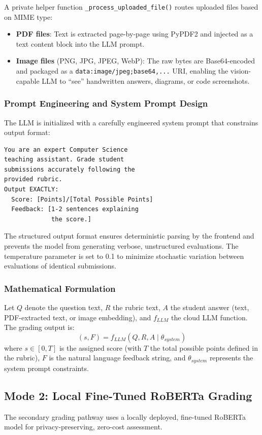\documentclass[conference]{IEEEtran}
\begin{document}
A private helper function \texttt{\_process\_uploaded\_file()} routes uploaded files based on MIME type:
\begin{itemize}[leftmargin=*]
    \item \textbf{PDF files}: Text is extracted page-by-page using PyPDF2 and injected as a text content block into the LLM prompt.
    \item \textbf{Image files} (PNG, JPG, JPEG, WebP): The raw bytes are Base64-encoded and packaged as a \texttt{data:image/jpeg;base64,...} URI, enabling the vision-capable LLM to ``see'' handwritten answers, diagrams, or code screenshots.
\end{itemize}

\subsubsection{Prompt Engineering and System Prompt Design}
The LLM is initialized with a carefully engineered system prompt that constrains output format:
\begin{lstlisting}[caption=AI Grader System Prompt]
You are an expert Computer Science 
teaching assistant. Grade student 
submissions accurately following the 
provided rubric.
Output EXACTLY:
  Score: [Points]/[Total Possible Points]
  Feedback: [1-2 sentences explaining 
             the score.]
\end{lstlisting}

The structured output format ensures deterministic parsing by the frontend and prevents the model from generating verbose, unstructured evaluations. The temperature parameter is set to 0.1 to minimize stochastic variation between evaluations of identical submissions.

\subsubsection{Mathematical Formulation}
Let $Q$ denote the question text, $R$ the rubric text, $A$ the student answer (text, PDF-extracted text, or image embedding), and $f_{LLM}$ the cloud LLM function. The grading output is:
\begin{equation}
(s, F) = f_{LLM}(Q, R, A \mid \theta_{system})
\end{equation}
where $s \in [0, T]$ is the assigned score (with $T$ the total possible points defined in the rubric), $F$ is the natural language feedback string, and $\theta_{system}$ represents the system prompt constraints.

\subsection{Mode 2: Local Fine-Tuned RoBERTa Grading}
The secondary grading pathway uses a locally deployed, fine-tuned RoBERTa model for privacy-preserving, zero-cost assessment.
\end{document}
